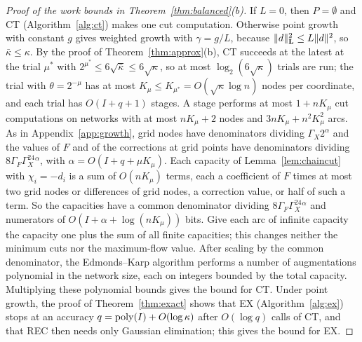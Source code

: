 \begin{proof}[Proof of the work bounds in Theorem~\ref{thm:balanced}(b)]
If $L=0$, then $P=\emptyset$ and CT (Algorithm~\ref{alg:ct}) makes one cut
computation. Otherwise point growth with constant $g$ gives weighted growth
with $\gamma=g/L$, because $\lVert d\rVert_{\mathbf L}^2\le L\lVert d\rVert^2$, so
$\bar\kappa\le\kappa$. By the proof of Theorem~\ref{thm:approx}(b), CT
succeeds at the latest at the trial $\mu^*$ with
$2^{\mu^*}\le6\sqrt{\bar\kappa}\le6\sqrt\kappa$, so at most
$\log_2(6\sqrt\kappa)$ trials are run; the trial with $\theta=2^{-\mu}$ has
at most $K_\mu\le K_{\mu^*}=O(\sqrt\kappa\log n)$ nodes per coordinate, and
each trial has $O(I+q+1)$ stages. A stage performs at most $1+nK_\mu$ cut
computations on networks with at most $nK_\mu+2$ nodes and
$3nK_\mu+n^2K_\mu^2$ arcs. As in
Appendix~\ref{app:growth}, grid nodes have denominators dividing
$\Gamma_X2^\alpha$ and the values of $F$ and of the corrections at grid
points have denominators dividing $8\Gamma_F\Gamma_X^24^\alpha$, with
$\alpha=O(I+q+\mu K_\mu)$. Each capacity of Lemma~\ref{lem:chaincut} with
$\chi_i=-d_i$ is a sum of $O(nK_\mu)$ terms, each a coefficient of $F$ times
at most two grid nodes or differences of grid nodes, a correction value, or
half of such a term. So the capacities have a common denominator dividing
$8\Gamma_F\Gamma_X^24^\alpha$ and numerators of $O(I+\alpha+\log(nK_\mu))$
bits. Give each arc of infinite capacity the capacity one plus the sum of
all finite capacities; this changes neither the minimum cuts nor the
maximum-flow value. After scaling by the common denominator, the
Edmonds--Karp algorithm performs a number of augmentations polynomial in the
network size, each on integers bounded by the total capacity. Multiplying
these polynomial bounds gives the bound for CT. Under point growth, the
proof of Theorem~\ref{thm:exact} shows that EX (Algorithm~\ref{alg:ex})
stops at an accuracy $q=\operatorname{poly}(I)+O(\log\kappa)$ after $O(\log q)$ calls of
CT, and that REC then needs only Gaussian elimination; this gives the bound
for EX.
\end{proof}
